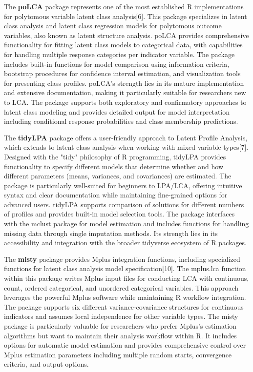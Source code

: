 \documentclass[main.tex]{subfiles}
\begin{document}
The \textbf{poLCA} package represents one of the most established R implementations for polytomous variable latent class analysis[6]. This package specializes in latent class analysis and latent class regression models for polytomous outcome variables, also known as latent structure analysis. poLCA provides comprehensive functionality for fitting latent class models to categorical data, with capabilities for handling multiple response categories per indicator variable. The package includes built-in functions for model comparison using information criteria, bootstrap procedures for confidence interval estimation, and visualization tools for presenting class profiles. poLCA's strength lies in its mature implementation and extensive documentation, making it particularly suitable for researchers new to LCA. The package supports both exploratory and confirmatory approaches to latent class modeling and provides detailed output for model interpretation including conditional response probabilities and class membership predictions.

The \textbf{tidyLPA} package offers a user-friendly approach to Latent Profile Analysis, which extends to latent class analysis when working with mixed variable types[7]. Designed with the "tidy" philosophy of R programming, tidyLPA provides functionality to specify different models that determine whether and how different parameters (means, variances, and covariances) are estimated. The package is particularly well-suited for beginners to LPA/LCA, offering intuitive syntax and clear documentation while maintaining fine-grained options for advanced users. tidyLPA supports comparison of solutions for different numbers of profiles and provides built-in model selection tools. The package interfaces with the mclust package for model estimation and includes functions for handling missing data through single imputation methods. Its strength lies in its accessibility and integration with the broader tidyverse ecosystem of R packages.

The \textbf{misty} package provides Mplus integration functions, including specialized functions for latent class analysis model specification[10]. The mplus.lca function within this package writes Mplus input files for conducting LCA with continuous, count, ordered categorical, and unordered categorical variables. This approach leverages the powerful Mplus software while maintaining R workflow integration. The package supports six different variance-covariance structures for continuous indicators and assumes local independence for other variable types. The misty package is particularly valuable for researchers who prefer Mplus's estimation algorithms but want to maintain their analysis workflow within R. It includes options for automatic model estimation and provides comprehensive control over Mplus estimation parameters including multiple random starts, convergence criteria, and output options.
\end{document}

